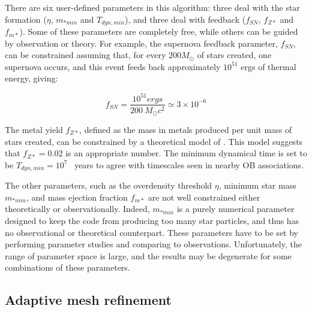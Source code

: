 There are six user-defined parameters in this algorithm:  three deal with the
star formation ($\eta$, $m_{*min}$ and $T_{dyn,min}$), and three 
deal with feedback ($f_{SN}$, $f_{Z*}$ and $f_{m*}$).  Some of these
parameters are completely free, while others can be guided by observation
or theory.  For example, the supernova feedback parameter, $f_{SN}$, can be 
constrained assuming that, for every $200 M_\odot$ of stars created, one
supernova occurs, and this event feeds back approximately $10^{51}$ ergs of
thermal energy, giving:

\begin{equation}
f_{SN} = \frac{10^{51} ergs}{200~M_\odot c^2} \simeq 3 \times 10^{-6}
\end{equation}

The metal yield $f_{Z*}$, defined as the mass in metals produced per unit
mass of stars created, can be constrained by a theoretical model of
 \citet{1995ApJS..101..181W}.  This model suggests that $f_{Z*} = 0.02$
is an appropriate number.  The minimum dynamical time is set to be $T_{dyn,min} = 10^7$
~years to agree with timescales seen in nearby OB associations.

The other parameters, such as the overdensity threshold $\eta$, minimum star
 mass $m_{*min}$, and mass ejection fraction $f_{m*}$ are not well constrained 
either theoretically or observationally.  Indeed, $m_{*min}$ is a purely
numerical parameter designed to keep the code from producing too many star 
particles, and thus has no observational or theoretical counterpart.  These
parameters have to be set by performing parameter studies and comparing to 
observations.  Unfortunately, the range of parameter space is large, and
the results may be degenerate for some combinations of these parameters.


\subsection{Adaptive mesh refinement}\label{sec.ov.amr}

